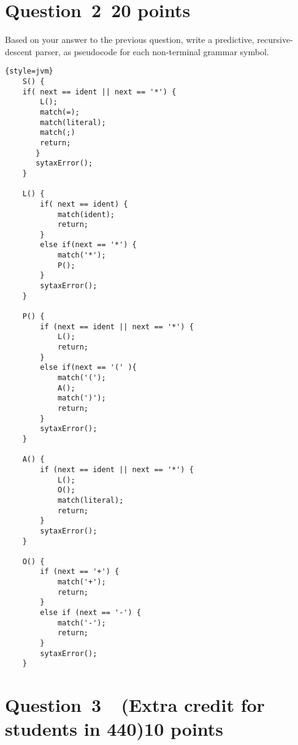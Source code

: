\documentclass[10pt]{article}
\begin{document}
\section*{Question~2~\hfill 20 points}

Based on your answer to the previous question, 
write a predictive, recursive-descent parser,
as pseudocode for each non-terminal grammar symbol.

\begin{framed}

\begin{lstlisting}{style=jvm}
    S() {
    if( next == ident || next == '*') {
        L();
        match(=);
        match(literal);
        match(;)
        return;
       }
       sytaxError();
    }

    L() {
        if( next == ident) {
            match(ident);
            return;
        }
        else if(next == '*') {
            match('*');
            P();
        }
        sytaxError();
    }

    P() {
        if (next == ident || next == '*') {
            L();
            return;
        }
        else if(next == '(' ){
            match('(');
            A();
            match(')');
            return;
        }
        sytaxError();
    }

    A() {
        if (next == ident || next == '*') {
            L();
            O();
            match(literal);
            return;
        }
        sytaxError();
    }

    O() {
        if (next == '+') {
            match('+');
            return;
        }
        else if (next == '-') {
            match('-');
            return;
        }
        sytaxError();
    }
\end{lstlisting}

\end{framed}

\section*{Question~3~~(Extra credit for students in 440)\hfill 10 points}
\end{document}
